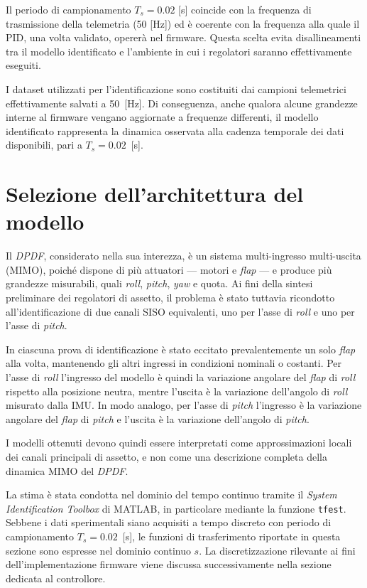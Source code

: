 \documentclass[11pt]{report}
\begin{document}
Il periodo di campionamento $T_s = 0.02$ [s] coincide con la frequenza di trasmissione della telemetria (50 [Hz]) ed è coerente con la frequenza alla quale il PID, una volta validato, opererà nel firmware. Questa scelta evita disallineamenti tra il modello identificato e l'ambiente in cui i regolatori saranno effettivamente eseguiti.

I dataset utilizzati per l'identificazione sono costituiti dai campioni telemetrici effettivamente salvati a 50~[Hz]. Di conseguenza, anche qualora alcune grandezze interne al firmware vengano aggiornate a frequenze differenti, il modello identificato rappresenta la dinamica osservata alla cadenza temporale dei dati disponibili, pari a $T_s = 0.02$~[s].

\section{Selezione dell'architettura del modello}
\label{sec:architettura_modello}

Il \textit{DPDF}, considerato nella sua interezza, è un sistema multi-ingresso multi-uscita (MIMO), poiché dispone di più attuatori --- motori e \textit{flap} --- e produce più grandezze misurabili, quali \textit{roll}, \textit{pitch}, \textit{yaw} e quota. Ai fini della sintesi preliminare dei regolatori di assetto, il problema è stato tuttavia ricondotto all'identificazione di due canali SISO equivalenti, uno per l'asse di \textit{roll} e uno per l'asse di \textit{pitch}.

In ciascuna prova di identificazione è stato eccitato prevalentemente un solo \textit{flap} alla volta, mantenendo gli altri ingressi in condizioni nominali o costanti. Per l'asse di \textit{roll} l'ingresso del modello è quindi la variazione angolare del \textit{flap} di \textit{roll} rispetto alla posizione neutra, mentre l'uscita è la variazione dell'angolo di \textit{roll} misurato dalla IMU. In modo analogo, per l'asse di \textit{pitch} l'ingresso è la variazione angolare del \textit{flap} di \textit{pitch} e l'uscita è la variazione dell'angolo di \textit{pitch}.

I modelli ottenuti devono quindi essere interpretati come approssimazioni locali dei canali principali di assetto, e non come una descrizione completa della dinamica MIMO del \textit{DPDF}.

La stima è stata condotta nel dominio del tempo continuo tramite il \textit{System Identification Toolbox} di MATLAB, in particolare mediante la funzione \texttt{tfest}. Sebbene i dati sperimentali siano acquisiti a tempo discreto con periodo di campionamento $T_s = 0.02$~[s], le funzioni di trasferimento riportate in questa sezione sono espresse nel dominio continuo $s$. La discretizzazione rilevante ai fini dell'implementazione firmware viene discussa successivamente nella sezione dedicata al controllore.
\end{document}
